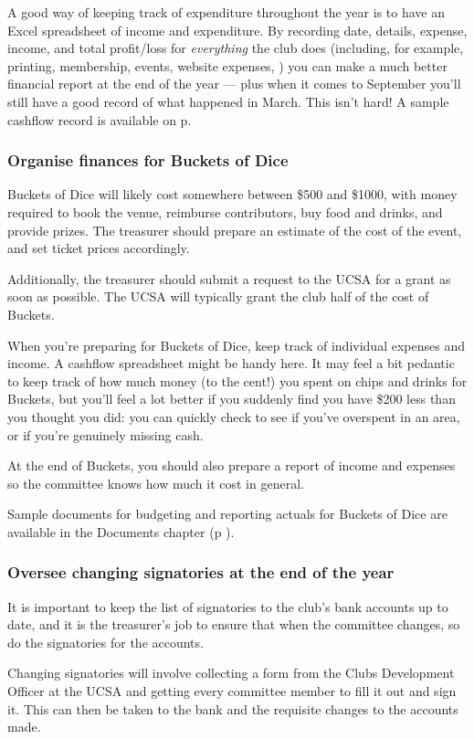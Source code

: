 A good way of keeping track of expenditure throughout the year is to have an Excel spreadsheet of income and expenditure. By recording date, details, expense, income, and total profit/loss for \textit{everything} the club does (including, for example, printing, membership, events, website expenses, \etc) you can make a much better financial report at the end of the year --- plus when it comes to September you'll still have a good record of what happened in March. This isn't hard! A sample cashflow record is available on p\pageref{sec:cashflow}.

\subsubsection{Organise finances for Buckets of Dice}

Buckets of Dice will likely cost somewhere between \$500 and \$1000, with money required to book the venue, reimburse contributors, buy food and drinks, and provide prizes. The treasurer should prepare an estimate of the cost of the event, and set ticket prices accordingly.

Additionally, the treasurer should submit a request to the UCSA for a grant as soon as possible. The UCSA will typically grant the club half of the cost of Buckets.

When you're preparing for Buckets of Dice, keep track of individual expenses and income. A cashflow spreadsheet might be handy here. It may feel a bit pedantic to keep track of how much money (to the cent!) you spent on chips and drinks for Buckets, but you'll feel a lot better if you suddenly find you have \$200 less than you thought you did: you can quickly check to see if you've overspent in an area, or if you're genuinely missing cash.

At the end of Buckets, you should also prepare a report of income and expenses so the committee knows how much it cost in general.

Sample documents for budgeting and reporting actuals for Buckets of Dice are available in the Documents chapter (p \pageref{cha:docs}).

\subsubsection{Oversee changing signatories at the end of the year}

It is important to keep the list of signatories to the club's bank accounts up to date, and it is the treasurer's job to ensure that when the committee changes, so do the signatories for the accounts.

Changing signatories will involve collecting a form from the Clubs Development Officer at the UCSA and getting every committee member to fill it out and sign it. This can then be taken to the bank and the requisite changes to the accounts made.